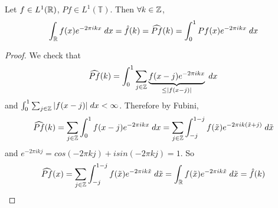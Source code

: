 \begin{lem}
    Let $f \in L^1(\mathbb{R})$, $Pf \in L^1(\mathbb{T})$. Then $\forall k \in \mathbb{Z}$,
    \[
        \int_{\mathbb{R}} f(x) e^{-2 \pi i k x} \; dx = \hat{f}(k) = \widehat{Pf}(k) = \int_0^1 Pf(x) e^{-2 \pi i k x} \; dx
    \]  
\end{lem}
\begin{proof}
    We check that 
    \[
        \widehat{Pf}(k) = \int_0^1 \sum_{j \in \mathbb{Z}} \underbrace{f(x-j) e^{-2 \pi i k x}}_{\leq |f(x-j)|} \; dx
    \] 
    and $\int_0^1 \sum_{j \in \mathbb{Z}} |f(x-j)| \; dx < \infty$. Therefore by Fubini,
    \[
        \widehat{Pf}(k) = \sum_{j \in \mathbb{Z}} \int_0^1 f(x-j) e^{-2 \pi i k x} \; dx = \sum_{j \in \mathbb{Z}} \int_{-j}^{1-j} f(\tilde{x}) e^{-2 \pi i k (\tilde{x}+j)} \; d\tilde{x}
    \]  
    and $e^{-2 \pi i k j} = cos(-2 \pi k j) + i sin(-2 \pi k j) = 1$. So
    \[
        \widehat{Pf}(x) = \sum_{j \in \mathbb{Z}} \int_{-j}^{1-j} f(\tilde{x})e^{-2 \pi i k \tilde{x}} \; d \tilde{x} = \int_{\mathbb{R}} f(\tilde{x})e^{-2 \pi i k \tilde{x}} \; d \tilde{x} = \hat{f}(k) \qedhere
    \]  
\end{proof}


